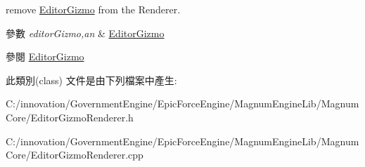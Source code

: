 remove \hyperlink{class_i_dream_sky_1_1_editor_gizmo}{Editor\+Gizmo} from the Renderer. 


\begin{DoxyParams}{參數}
{\em editor\+Gizmo,an} & \hyperlink{class_i_dream_sky_1_1_editor_gizmo}{Editor\+Gizmo} \\
\hline
\end{DoxyParams}
\begin{DoxySeeAlso}{參閱}
\hyperlink{class_i_dream_sky_1_1_editor_gizmo}{Editor\+Gizmo} 
\end{DoxySeeAlso}


此類別(class) 文件是由下列檔案中產生\+:\begin{DoxyCompactItemize}
\item 
C\+:/innovation/\+Government\+Engine/\+Epic\+Force\+Engine/\+Magnum\+Engine\+Lib/\+Magnum\+Core/Editor\+Gizmo\+Renderer.\+h\item 
C\+:/innovation/\+Government\+Engine/\+Epic\+Force\+Engine/\+Magnum\+Engine\+Lib/\+Magnum\+Core/Editor\+Gizmo\+Renderer.\+cpp\end{DoxyCompactItemize}
